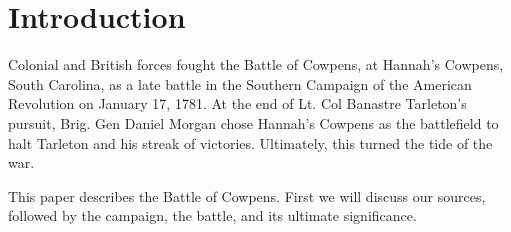 \section{Introduction}



Colonial and British forces fought the Battle of Cowpens, at Hannah's Cowpens,
South Carolina, as a late battle in the Southern Campaign of the American
Revolution on January 17, 1781. At the end of Lt. Col Banastre Tarleton's
pursuit, Brig. Gen Daniel Morgan chose Hannah's Cowpens as the
battlefield to halt Tarleton and his streak of victories. Ultimately, this
turned the tide of the war.

This paper describes the Battle of Cowpens. First we will discuss our sources,
followed by the campaign, the battle, and its ultimate significance.









